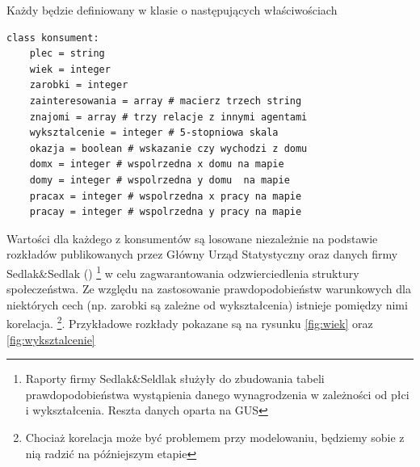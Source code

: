 \documentclass[polish, twoside, 12pt, a4paper]{article}
\theoremstyle{definition}
\theoremstyle{plain}
\theoremstyle{remark}
\begin{document}
Każdy będzie definiowany w klasie o następujących właściwościach \\


\begin{lstlisting}[frame=single]  
class konsument:   
	plec = string
	wiek = integer 
	zarobki = integer 
	zainteresowania = array # macierz trzech string 
	znajomi = array # trzy relacje z innymi agentami
	wyksztalcenie = integer # 5-stopniowa skala 
	okazja = boolean # wskazanie czy wychodzi z domu
	domx = integer # wspolrzedna x domu na mapie
	domy = integer # wspolrzedna y domu  na mapie
	pracax = integer # wspolrzedna x pracy na mapie
	pracay = integer # wspolrzedna y pracy na mapie
\end{lstlisting}

Wartości dla każdego z konsumentów są losowane niezależnie na podstawie rozkładów publikowanych przez Główny Urząd Statystyczny \cite{GUS2011} oraz danych firmy Sedlak\&Sedlak (\cite{Sedlak2013}) \footnote{Raporty firmy Sedlak\&Seldlak służyły do zbudowania tabeli prawdopodobieństwa wystąpienia danego wynagrodzenia w zależności od płci i wykształcenia. Reszta danych oparta na GUS} w celu zagwarantowania odzwierciedlenia struktury społeczeństwa. Ze względu na zastosowanie prawdopodobieństw warunkowych dla niektórych cech (np. zarobki są zależne od wykształcenia) istnieje pomiędzy nimi korelacja. \footnote{Chociaż korelacja może być problemem przy modelowaniu, będziemy sobie z nią radzić na późniejszym etapie}. Przykładowe rozkłady pokazane są na rysunku \ref{fig:wiek} oraz \ref{fig:wyksztalcenie}
\end{document}
